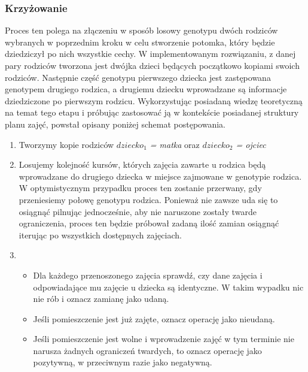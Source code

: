 \subsubsection{Krzyżowanie}
Proces ten polega na złączeniu w sposób losowy genotypu dwóch rodziców wybranych w poprzednim kroku w celu stworzenie potomka, który będzie dziedziczył po nich wszystkie cechy. W implementowanym rozwiązaniu, z danej pary rodziców tworzona jest dwójka dzieci będących początkowo kopiami swoich rodziców. Następnie część genotypu pierwszego dziecka jest zastępowana genotypem drugiego rodzica, a drugiemu dziecku wprowadzane są informacje dziedziczone po pierwszym rodzicu. Wykorzystując posiadaną wiedzę teoretyczną na temat tego etapu i próbując zastosować ją w kontekście posiadanej struktury planu zajęć, powstał opisany poniżej schemat postępowania.
\begin{enumerate}
\item Tworzymy kopie rodziców \emph{$dziecko_1$ = matka} oraz \emph{$dziecko_2$ = ojciec}
\item Losujemy kolejność kursów, których zajęcia zawarte u rodzica będą wprowadzane do drugiego dziecka w miejsce zajmowane w genotypie rodzica. W optymistycznym przypadku proces ten zostanie przerwany, gdy przeniesiemy połowę genotypu rodzica. Ponieważ nie zawsze uda się to osiągnąć pilnując jednocześnie, aby nie naruszone zostały twarde ograniczenia, proces ten będzie próbował zadaną ilość zamian osiągnąć iterując po wszystkich dostępnych zajęciach.
\item 
\begin{itemize}
\item Dla każdego przenoszonego zajęcia sprawdź, czy dane zajęcia i odpowiadające mu zajęcie u dziecka są identyczne. W takim wypadku nic nie rób i oznacz zamianę jako udaną.
\item Jeśli pomieszczenie jest już zajęte, oznacz operację jako nieudaną.
\item Jeśli pomieszczenie jest wolne i wprowadzenie zajęć w tym terminie nie narusza żadnych ograniczeń twardych, to oznacz operację jako pozytywną, w przeciwnym razie jako negatywną.
\end{itemize}
\end{enumerate}
